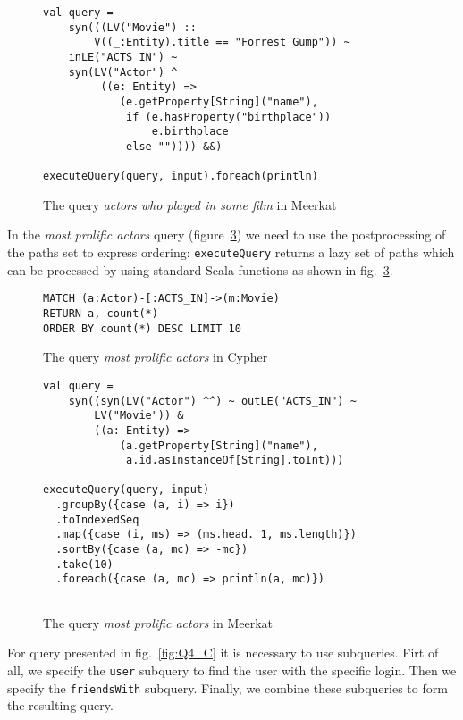 \begin{figure}[h]
\begin{lstlisting}
val query = 
    syn(((LV("Movie") :: 
        V((_:Entity).title == "Forrest Gump")) ~ 
    inLE("ACTS_IN") ~
    syn(LV("Actor") ^ 
         ((e: Entity) => 
            (e.getProperty[String]("name"),
             if (e.hasProperty("birthplace")) 
                 e.birthplace 
             else "")))) &&)
 
executeQuery(query, input).foreach(println)
\end{lstlisting}
\caption{The query \emph{actors who played in some film} in Meerkat}
\label{fig:Q1_M}
\end{figure}


In the \emph{most prolific actors} query (figure~\ref{fig:Q2_C}) we need to use the postprocessing of the paths set to express ordering: \lstinline{executeQuery} returns a lazy set of paths which can be processed by using standard Scala functions as shown in fig.~\ref{fig:Q2_C}.

\begin{figure}[h]
\begin{lstlisting}
MATCH (a:Actor)-[:ACTS_IN]->(m:Movie)
RETURN a, count(*)
ORDER BY count(*) DESC LIMIT 10
\end{lstlisting}
\caption{The query \emph{most prolific actors} in Cypher}
\label{fig:Q2_C}
\end{figure}


\begin{figure}[h]
\begin{lstlisting}
val query = 
    syn((syn(LV("Actor") ^^) ~ outLE("ACTS_IN") ~ 
        LV("Movie")) &
        ((a: Entity) => 
            (a.getProperty[String]("name"), 
             a.id.asInstanceOf[String].toInt)))
 
executeQuery(query, input)
  .groupBy({case (a, i) => i})
  .toIndexedSeq
  .map({case (i, ms) => (ms.head._1, ms.length)})
  .sortBy({case (a, mc) => -mc})
  .take(10)
  .foreach({case (a, mc) => println(a, mc)})
  
\end{lstlisting}
\caption{The query \emph{most prolific actors} in Meerkat}
\label{fig:Q2_C}
\end{figure}

For query presented in fig.~\ref{fig:Q4_C} it is necessary to use subqueries.
Firt of all, we specify the \lstinline{user} subquery to find the user with the specific login.
Then we specify the \lstinline{friendsWith} subquery.
Finally, we combine these subqueries to form the resulting query.

